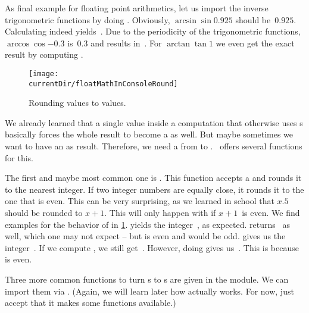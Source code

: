 As final example for floating point arithmetics, let us import the inverse trigonometric functions by doing .
Obviously, $\arcsin{\sin{0.925}}$ should be~$0.925$.
Calculating  indeed yields~.
Due to the periodicity of the trigonometric functions, $\arccos{\cos{-0.3}}$ is~$0.3$ and  results in~.
For $\arctan{\tan{1}}$ we even get the exact result  by computing .%
\endhsection%
%
%
%
\begin{figure}%
\centering%
\texttt{[image: \\currentDir/floatMathInConsoleRound]}%
\caption{Rounding  values to  values.}%
\label{fig:floatMathInConsoleRound}%
\end{figure}%
%
We already learned that a single  value inside a computation that otherwise uses s basically forces the whole result to become a  as well.
But maybe sometimes we want to have an  as result.
Therefore, we need a  from  to .
\python\ offers several functions for this.

The first and maybe most common one is .
This function accepts a  and rounds it to the nearest integer.
If two integer numbers are equally close, it rounds it to the one that is even.
This can be very surprising, as we learned in school that $x.5$ should be rounded to $x+1$.
This will only happen with  if $x+1$~is even.
We find examples for the behavior of  in \cref{fig:floatMathInConsoleRound}.
 yields the integer~, as expected.
 returns~ as well, which one may not expect -- but  is even and  would be odd.
 gives us the integer~.
If we compute , we still get~.
However, doing  gives us~.
This is because  is even.

Three more common functions to turn s to s are given in the  module.
We can import them via .
(Again, we will learn later how  actually works.
For now, just accept that it makes some functions available.)

